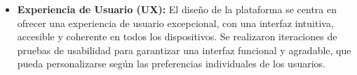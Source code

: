 \begin{itemize}
    \item \textbf{Experiencia de Usuario (UX):} El diseño de la plataforma se centra en ofrecer una experiencia de usuario 
    excepcional, con una interfaz intuitiva, accesible y coherente en todos los dispositivos. Se realizaron iteraciones 
    de pruebas de usabilidad para garantizar una interfaz funcional y agradable, que pueda personalizarse según las preferencias 
    individuales de los usuarios.
\end{itemize}
